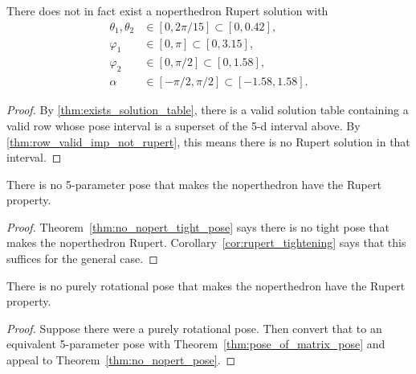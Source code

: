 \begin{theorem}
\label{thm:no_nopert_tight_pose}
\leanok
There does not in fact exist a noperthedron Rupert solution with
\begin{align*}
\theta_1,\theta_2&\in[0,2\pi/15] \subset [0,0.42], \\
\varphi_1&\in [0,\pi] \subset [0,3.15],\\
\varphi_2&\in [0,\pi/2] \subset [0,1.58],\\
\alpha &\in [-\pi/2,\pi/2] \subset [-1.58,1.58].
\end{align*}
\end{theorem}

\begin{proof}
\leanok
{}
By \ref{thm:exists_solution_table}, there is a valid solution table
containing a valid row whose pose interval is a superset of
the 5-d interval above. By \ref{thm:row_valid_imp_not_rupert}, this means
there is no Rupert solution in that interval.
\end{proof}

\begin{theorem}
\label{thm:no_nopert_pose}
\leanok
There is no 5-parameter pose that makes the noperthedron have the Rupert property.
\end{theorem}
\begin{proof}
\leanok
Theorem~\ref{thm:no_nopert_tight_pose} says there is no tight pose
that makes the noperthedron Rupert. Corollary~\ref{cor:rupert_tightening}
says that this suffices for the general case.
\end{proof}


\begin{theorem}
\label{thm:no_nopert_rot_pose}
\leanok
There is no purely rotational pose that makes the noperthedron have the Rupert property.
\end{theorem}
\begin{proof}
\leanok
Suppose there were a purely rotational pose. Then convert that to an equivalent 5-parameter pose
with Theorem~\ref{thm:pose_of_matrix_pose} and
appeal to Theorem~\ref{thm:no_nopert_pose}.
\end{proof}


